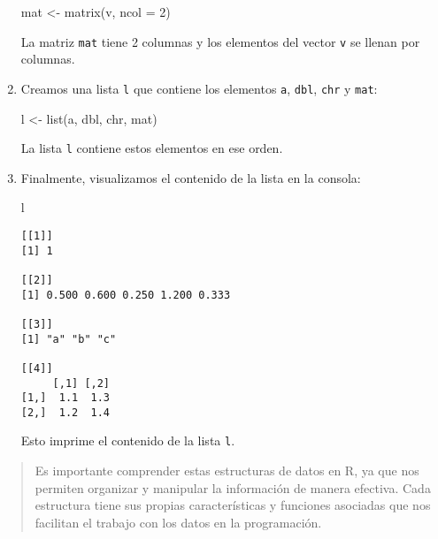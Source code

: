 \documentclass[
  a4paper,
]{article}
\newenvironment{Shaded}{}{}
\newcommand{\AttributeTok}[1]{\textcolor[rgb]{0.84,0.23,0.29}{#1}}
\newcommand{\DecValTok}[1]{\textcolor[rgb]{0.00,0.36,0.77}{#1}}
\newcommand{\FunctionTok}[1]{\textcolor[rgb]{0.44,0.26,0.76}{#1}}
\newcommand{\NormalTok}[1]{\textcolor[rgb]{0.14,0.16,0.18}{#1}}
\newcommand{\OtherTok}[1]{\textcolor[rgb]{0.44,0.26,0.76}{#1}}
\begin{document}
\begin{enumerate}
\begin{Shaded}
\begin{Highlighting}[]
\NormalTok{mat }\OtherTok{\textless{}{-}} \FunctionTok{matrix}\NormalTok{(v, }\AttributeTok{ncol =} \DecValTok{2}\NormalTok{)}
\end{Highlighting}
\end{Shaded}

  La matriz \texttt{mat} tiene 2 columnas y los elementos del vector
  \texttt{v} se llenan por columnas.
\item
  Creamos una lista \texttt{l} que contiene los elementos \texttt{a},
  \texttt{dbl}, \texttt{chr} y \texttt{mat}:

\begin{Shaded}
\begin{Highlighting}[]
\NormalTok{l }\OtherTok{\textless{}{-}} \FunctionTok{list}\NormalTok{(a, dbl, chr, mat)}
\end{Highlighting}
\end{Shaded}

  La lista \texttt{l} contiene estos elementos en ese orden.
\item
  Finalmente, visualizamos el contenido de la lista en la consola:

\begin{Shaded}
\begin{Highlighting}[]
\NormalTok{l}
\end{Highlighting}
\end{Shaded}

\begin{verbatim}
[[1]]
[1] 1

[[2]]
[1] 0.500 0.600 0.250 1.200 0.333

[[3]]
[1] "a" "b" "c"

[[4]]
     [,1] [,2]
[1,]  1.1  1.3
[2,]  1.2  1.4
\end{verbatim}

  Esto imprime el contenido de la lista \texttt{l}.
\end{enumerate}

\begin{quote}
Es importante comprender estas estructuras de datos en R, ya que nos
permiten organizar y manipular la información de manera efectiva. Cada
estructura tiene sus propias características y funciones asociadas que
nos facilitan el trabajo con los datos en la programación.
\end{quote}


\printbibliography
\end{document}
